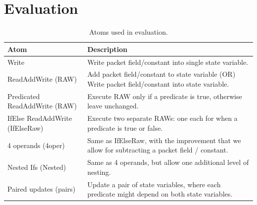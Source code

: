 \section{Evaluation}
\label{s:eval}

\begin{table}[!t]
  \begin{scriptsize}
  \begin{tabular}{|p{}|p{}|}
    \hline
    Atom & Description \\
    \hline
    Write & Write packet field/constant into single state variable. \\
    \hline
    ReadAddWrite (RAW) & Add packet field/constant to state variable (OR) Write packet field/constant into state variable. \\
    \hline
    Predicated ReadAddWrite (RAW) & Execute RAW only if a predicate is true, otherwise leave unchanged. \\
    \hline
    IfElse ReadAddWrite (IfElseRaw) & Execute two separate RAWs: one each for when a predicate is true or false.\\
    4 operands (4oper) & Same as IfElseRaw, with the improvement that we allow for subtracting a packet field / constant. \\
    Nested Ifs (Nested) & Same as 4 operands, but allow one additional level of nesting. \\
    Paired updates (pairs) & Update a pair of state variables, where each predicate might depend on both state variables. \\
  \end{tabular}
  \end{scriptsize}
  \caption{Atoms used in evaluation.}
  \label{tab:templates}
\end{table}

